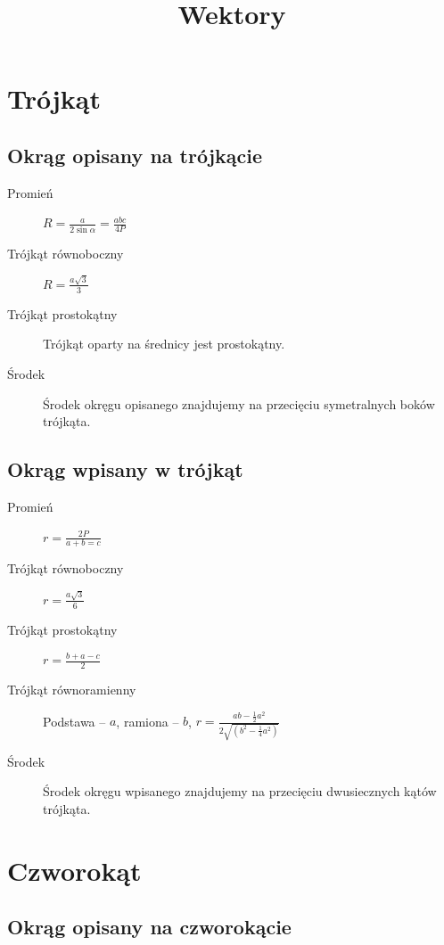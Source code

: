 \documentclass [a4paper, 12pt, oneside]{article}
\author{}
\title{Wektory}
\begin{document}
\maketitle
\section{Trójkąt}

\subsection{Okrąg opisany na trójkącie}

\begin{description}
\item[Promień] $R = \frac{a}{2\sin\alpha} = \frac{abc}{4P}$
\item[Trójkąt równoboczny] $R = \frac{a\sqrt{3}}3$
\item[Trójkąt prostokątny] Trójkąt oparty na średnicy jest prostokątny.
\item[Środek] Środek okręgu opisanego znajdujemy na przecięciu symetralnych boków trójkąta.
\end{description}

\subsection{Okrąg wpisany w trójkąt}

\begin{description}
\item[Promień] $r = \frac{2P}{a+b=c}$
\item[Trójkąt równoboczny] $r = \frac{a\sqrt3}6$
\item[Trójkąt prostokątny] $r = \frac{b+a-c}2$
\item[Trójkąt równoramienny] Podstawa -- $a$, ramiona -- $b$, $r = \frac{ab-\frac12a^2}{2\sqrt{\left(b^2-\frac14a^2\right)}}$
\item[Środek] Środek okręgu wpisanego znajdujemy na przecięciu dwusiecznych kątów trójkąta.
\end{description}

\section{Czworokąt}

\subsection{Okrąg opisany na czworokącie}
\end{document}
